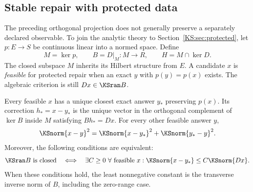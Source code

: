 \subsection{Stable repair with protected data}
The preceding orthogonal projection does not generally preserve a separately declared observable. To join the analytic theory to Section~\ref{KS:sec:protected}, let \(p:E\to S\) be continuous linear into a normed space. Define
\[
 M=\ker p,\qquad B=D|_M:M\to R,\qquad H=M\cap\ker D.
\]
The closed subspace \(M\) inherits its Hilbert structure from \(E\). A candidate \(x\) is \emph{feasible} for protected repair when an exact \(y\) with \(p(y)=p(x)\) exists. The algebraic criterion is still \(Dx\in\KSran B\).

\begin{KStheorem}\label{KS:KS56}
Every feasible \(x\) has a unique closest exact answer \(y_*\) preserving \(p(x)\). Its correction \(h_*=x-y_*\) is the unique vector in the orthogonal complement of \(\ker B\) inside \(M\) satisfying \(Bh_*=Dx\). For every other feasible answer \(y\),
\[
 \KSnorm{x-y}^2=\KSnorm{x-y_*}^2+\KSnorm{y_*-y}^2.
\]
Moreover, the following conditions are equivalent:
\[
 \KSran B\text{ is closed}
 \quad\Longleftrightarrow\quad
 \exists C\ge0\ \forall\text{ feasible }x:
 \KSnorm{x-y_*}\le C\KSnorm{Dx}.
\]
When these conditions hold, the least nonnegative constant is the transverse inverse norm of \(B\), including the zero-range case.
\end{KStheorem}
